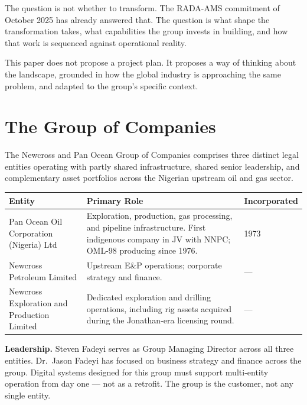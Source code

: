 \documentclass[10pt]{article}
\newcommand{\spacer}{\vspace{10pt}}
\newcommand{\bigspacer}{\vspace{16pt}}
\begin{document}
The question is not whether to transform. The RADA-AMS commitment of October
2025 has already answered that. The question is what shape the transformation
takes, what capabilities the group invests in building, and how that work is
sequenced against operational reality.

This paper does not propose a project plan. It proposes a way of thinking about
the landscape, grounded in how the global industry is approaching the same
problem, and adapted to the group's specific context.

\bigspacer

\section{The Group of Companies}

The Newcross and Pan Ocean Group of Companies comprises three distinct legal
entities operating with partly shared infrastructure, shared senior leadership,
and complementary asset portfolios across the Nigerian upstream oil and gas
sector.

\spacer
\small
\begin{tabularx}{\columnwidth}{@{}lXl@{}}
\toprule
\textbf{Entity} & \textbf{Primary Role} & \textbf{Incorporated} \\
\midrule
Pan Ocean Oil Corporation (Nigeria) Ltd
  & Exploration, production, gas processing, and pipeline infrastructure.
    First indigenous company in JV with NNPC; OML-98 producing since 1976.
  & 1973 \\
Newcross Petroleum Limited
  & Upstream E\&P operations; corporate strategy and finance.
  & --- \\
Newcross Exploration and Production Limited
  & Dedicated exploration and drilling operations, including rig assets
    acquired during the Jonathan-era licensing round.
  & --- \\
\bottomrule
\end{tabularx}
\normalsize

\spacer
{\small\color{darkgrey}
\textbf{Leadership.}\enspace
Steven Fadeyi serves as Group Managing Director across all three entities.
Dr.\ Jason Fadeyi has focused on business strategy and finance across the
group. Digital systems designed for this group must support multi-entity
operation from day one --- not as a retrofit. The group is the customer,
not any single entity.
}
\end{document}
